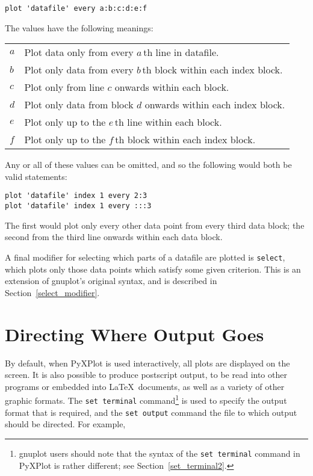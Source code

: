\documentclass[a4paper,onecolumn,11pt]{book}
\begin{document}
\begin{verbatim}
plot 'datafile' every a:b:c:d:e:f
\end{verbatim}

The values have the following meanings:

\begin{longtable}{p{1.2cm}p{10.5cm}}
$a$ & Plot data only from every $a\,$th line in datafile. \\
$b$ & Plot only data from every $b\,$th block within each index block. \\
$c$ & Plot only from line $c$ onwards within each block. \\
$d$ & Plot only data from block $d$ onwards within each index block. \\
$e$ & Plot only up to the $e\,$th line within each block. \\
$f$ & Plot only up to the $f\,$th block within each index block. \\
\end{longtable}

\noindent Any or all of these values can be omitted, and so the following would
both be valid statements:

\begin{verbatim}
plot 'datafile' index 1 every 2:3
plot 'datafile' index 1 every :::3
\end{verbatim}

\noindent The first would plot only every other data point from every third
data block; the second from the third line onwards within each data block.

A final modifier for selecting which parts of a datafile are plotted is
\texttt{select}, which plots only those data points which satisfy some given
criterion. This is an extension of gnuplot's original syntax, and is described
in Section~\ref{select_modifier}.

\newpage %

\section{Directing Where Output Goes}
\label{directing_output}

By default, when PyXPlot is used interactively, all plots are displayed on the
screen. It is also possible to produce postscript output, to be read into other
programs or embedded into \LaTeX\ documents, as well as a variety of other
graphic formats. The \texttt{set terminal} command\footnote{gnuplot users should note that
the syntax of the \texttt{set terminal} command in PyXPlot is rather different;
see Section~\ref{set_terminal2}.} is used to specify the output format that is
required, and the \texttt{set output} command the file to which output should be
directed. For example,
\end{document}
